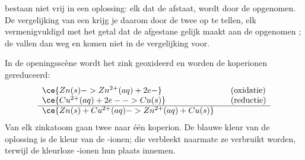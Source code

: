 \begin{proposition}\label{prop:g11:redox:no-free-electrons}
 bestaan niet vrij in een oplossing: elk  dat de
 afstaat, wordt door de  opgenomen. De vergelijking van
een  krijg je daarom door de twee  op te tellen,
elk vermenigvuldigd met het getal dat de afgestane  gelijk
maakt aan de opgenomen ; de  vallen dan weg en komen
niet in de vergelijking voor.
\end{proposition}

\begin{example}\label{ex:g11:redox:zinc-copper}
In de openingsscène wordt het zink geoxideerd en worden de koperionen
gereduceerd:
\[
\begin{array}{l@{\qquad}l}
  \ce{Zn(s) -> Zn^{2+}(aq) + 2e-} & \text{(oxidatie)}\\
  \ce{Cu^{2+}(aq) + 2e- -> Cu(s)} & \text{(reductie)}\\
  \hline
  \ce{Zn(s) + Cu^{2+}(aq) -> Zn^{2+}(aq) + Cu(s)} &
\end{array}
\]
Van elk zinkatoom gaan twee  naar één koperion. De blauwe kleur
van de oplossing is de kleur van de -ionen; die verbleekt
naarmate ze verbruikt worden, terwijl de kleurloze -ionen hun
plaats innemen.
\end{example}

